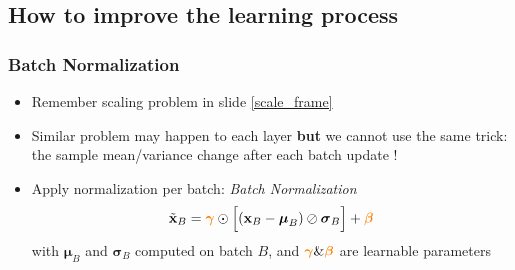 \documentclass[pressentation,10pt,aspectratio=169,xcolor=table, colorlinks=true]{beamer}
\begin{document}
  \subsection{How to improve the learning process}

  \begin{frame}
    \frametitle{Batch Normalization}
    \begin{itemize}
    \item Remember scaling problem in slide \ref{scale_frame}
    \item Similar problem may happen to each layer \textbf{but} we cannot use the same trick: the sample mean/variance change after each batch update !
    \item<2-> Apply normalization per batch: \emph{Batch Normalization}
      \begin{align*}
        \tilde{\mathbf{x}}_B = \textcolor{orange}{\boldsymbol{\gamma}}\odot\Big[(\mathbf{x}_B-\boldsymbol{\mu}_B)\oslash\boldsymbol{\sigma}_B\Big] + \textcolor{orange}{\boldsymbol{\beta}}
      \end{align*}
      with \(\boldsymbol{\mu}_B\) and \(\boldsymbol{\sigma}_B\) computed on batch \(B\), and \(\textcolor{orange}{\boldsymbol{\gamma}} \& \textcolor{orange}{\boldsymbol{\beta}}\) are learnable parameters
    \end{itemize}

  \end{frame}
\end{document}
